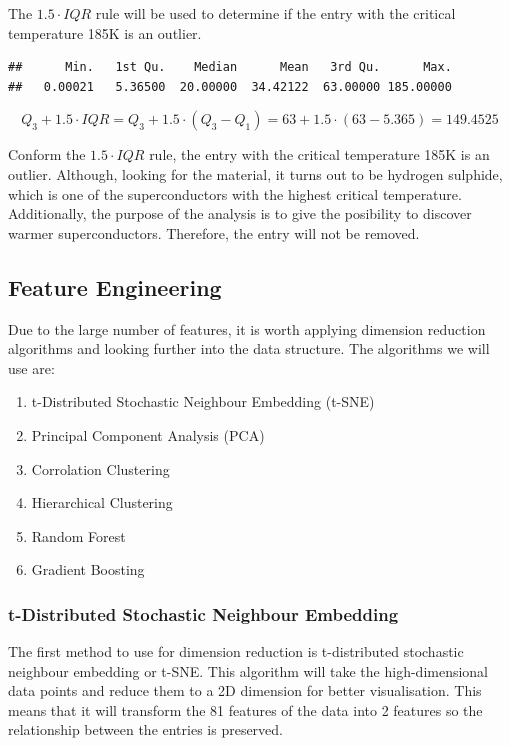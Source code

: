 \documentclass{article}\usepackage[]{graphicx}\usepackage[]{xcolor}
\makeatletter
\newenvironment{kframe}{%
 \def\at@end@of@kframe{}%
 \ifinner\ifhmode%
  \def\at@end@of@kframe{\end{minipage}}%
  \begin{minipage}{\columnwidth}%
 \fi\fi%
 \def\FrameCommand##1{\hskip\@totalleftmargin \hskip-\fboxsep
 \colorbox{shadecolor}{##1}\hskip-\fboxsep
     \hskip-\linewidth \hskip-\@totalleftmargin \hskip\columnwidth}%
 \MakeFramed {\advance\hsize-\width
   \@totalleftmargin\z@ \linewidth\hsize
   \@setminipage}}%
 {\par\unskip\endMakeFramed%
 \at@end@of@kframe}
\newenvironment{knitrout}{}{} %
\makeatother
\begin{document}
The $1.5\cdot IQR$ rule will be used to determine if the entry with the critical temperature 185K is an outlier.

\begin{knitrout}
\color{fgcolor}\begin{kframe}
\begin{verbatim}
##      Min.   1st Qu.    Median      Mean   3rd Qu.      Max. 
##   0.00021   5.36500  20.00000  34.42122  63.00000 185.00000
\end{verbatim}
\end{kframe}
\end{knitrout}

$$Q_3 + 1.5 \cdot IQR = Q_3 + 1.5 \cdot (Q_3 - Q_1) = 63 + 1.5 \cdot (63 - 5.365) = 149.4525$$

Conform the $1.5 \cdot IQR$ rule, the entry with the critical temperature 185K is an outlier. Although, looking for the material, it turns out to be hydrogen sulphide, which is one of the superconductors with the highest critical temperature. Additionally, the purpose of the analysis is to give the posibility to discover warmer superconductors. Therefore, the entry will not be removed.


\subsection{Feature Engineering}
Due to the large number of features, it is worth applying dimension reduction algorithms and looking further into the data structure. The algorithms we will use are: 

\begin{enumerate}
    \item t-Distributed Stochastic Neighbour Embedding (t-SNE)
    \item Principal Component Analysis (PCA)
    \item Corrolation Clustering
    \item Hierarchical Clustering
    \item Random Forest
    \item Gradient Boosting
\end{enumerate}


\subsubsection{t-Distributed Stochastic Neighbour Embedding}
The first method to use for dimension reduction is t-distributed stochastic neighbour embedding or t-SNE. This algorithm will take the high-dimensional data points and reduce them to a 2D dimension for better visualisation. This means that it will transform the 81 features of the data into 2 features so the relationship between the entries is preserved.
\end{document}
